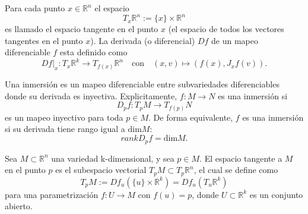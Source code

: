 \documentclass{beamer}
\def\realR{\mathbb{R}} %
\begin{document}
\begin{frame}
    \begin{definition}[Espacio tangente a $\realR^{n}$]
        Para cada punto $x \in \realR^{n}$ el espacio
        $$ T_{x}\realR^{n} := \{x\} \times \realR^{n} $$
        es llamado el espacio tangente en el punto $x$ (el espacio de todos los vectores
        tangentes en el punto $x$). La derivada (o diferencial) $Df$ de un mapeo diferenciable
        $f$ esta definido como
        $$ Df|_{x}: T_{x}\realR^{k} \rightarrow T_{f(x)}\realR^{n} \quad \text{con} \quad
        (x,v) \mapsto (f(x),J_{x}f(v)) \text{.} $$
    \end{definition}
\end{frame}

\begin{frame}
    \begin{definition}\label{def:immersion}
        Una inmersi\'on es un mapeo diferenciable entre subvariedades diferenciables donde su
        derivada es inyectiva. Explicitamente, $f:M \rightarrow N$ es una inmersi\'on si
        $$ D_{p}f: T_{p}M \rightarrow T_{f(p)}N $$
        es un mapeo inyectivo para toda $p \in M$. De forma equivalente, $f$ es una inmersi\'on
        si su derivada tiene rango igual a dim$M$:
        $$ rank D_{p}f = \text{dim}M \text{.} $$
    \end{definition}
\end{frame}

\begin{frame}
\begin{definition}
    Sea $M \subset \realR^{n}$ una variedad k-dimensional, y sea $p \in M$. El
    espacio tangente a $M$ en el punto $p$ es el subespacio vectorial $T_{p}M \subset T_{p}\realR^{n}$,
    el cual se define como
    $$ T_{p}M := Df_{u}(\{u\} \times \realR^{k})=Df_{u}(T_{u}\realR^{k}) $$
    para una parametrizaci\'on $f:U \rightarrow M$ con $f(u) = p$, donde $U \subset \realR^{k}$ es
    un conjunto abierto.
\end{definition}
\end{frame}
\end{document}
